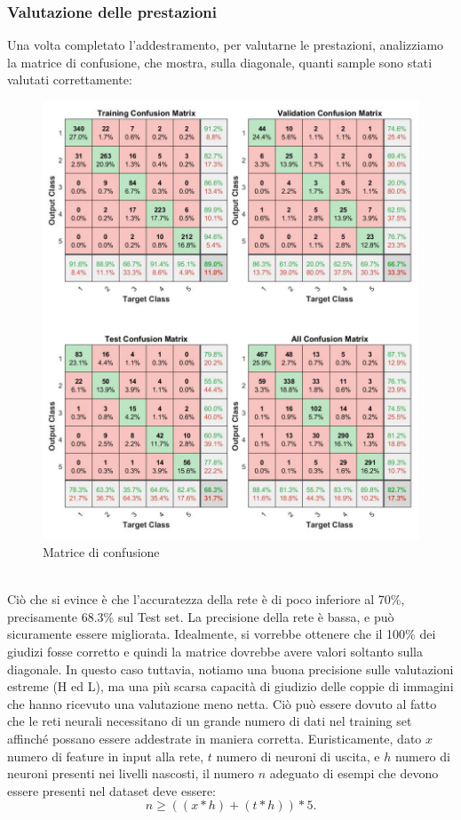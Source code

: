 \documentclass[a4paper,11pt]{article}
\begin{document}
    \subsubsection{Valutazione delle prestazioni}
    Una volta completato l'addestramento, per valutarne le prestazioni, analizziamo la matrice di confusione, che mostra, sulla diagonale, quanti sample sono stati valutati correttamente:
    \begin{figure}[h]
        \centering
        \includegraphics[scale=0.38]{confusion1}
        \caption{Matrice di confusione}
    \end{figure}
    \\Ciò che si evince è che l'accuratezza della rete è di poco inferiore al 70\%, precisamente 68.3\% sul Test set. 
    La precisione della rete è bassa, e può sicuramente essere migliorata. Idealmente, si vorrebbe ottenere che il 100\% dei giudizi fosse corretto e quindi
    la matrice dovrebbe avere valori soltanto sulla diagonale. In questo caso tuttavia, notiamo una buona precisione sulle valutazioni estreme (H ed L), ma una più scarsa capacità di giudizio delle coppie di immagini che hanno ricevuto una valutazione meno netta.
    Ciò può essere dovuto al fatto che le reti neurali necessitano di un grande numero di dati nel training set affinché possano essere addestrate in maniera corretta.
    Euristicamente, dato $x$ numero di feature in input alla rete, $t$ numero di neuroni di uscita, e $h$ numero di neuroni presenti nei livelli nascosti, il numero $n$ adeguato di esempi che devono essere presenti nel dataset deve essere:
    $$ n \geq ((x*h)+(t*h))*5.$$
\end{document}

